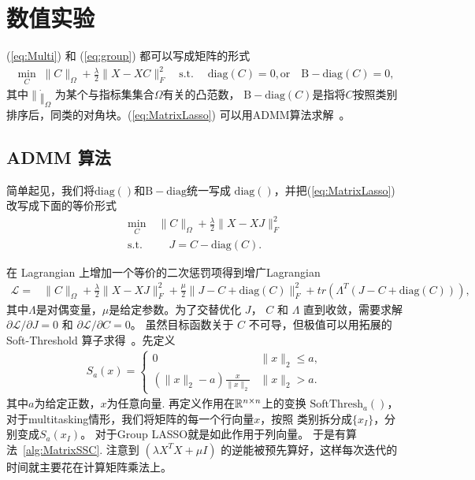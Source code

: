 \documentclass[main.tex]{subfiles}
\begin{document}
\chapter{数值实验}\label{chp:experiments}

(\ref{eq:Multi}) 和 (\ref{eq:group}) 都可以写成矩阵的形式
\begin{align}\label{eq:MatrixLasso}
  \min_{C} \; \|C\|_{\Omega}+\frac{\lambda}{2}\|X-XC\|_F^2 \quad
  \text{s.t.} \;\quad\mathrm{diag}(C)=0, \text{or} \quad \mathrm{B-diag}(C)=0,
\end{align}
其中$\|\dot\|_{\Omega}$ 为某个与指标集集合$\Omega$有关的凸范数，
$\mathrm{B-diag}(C)$是指将$C$按照类别排序后，同类的对角块。(\ref{eq:MatrixLasso})
可以用ADMM算法求解~\cite{boyd2011admm}。
\section{ADMM 算法}
简单起见，我们将$\mathrm{diag}()$和$\mathrm{B-diag}$统一写成
$\mathrm{diag}()$，并把(\ref{eq:MatrixLasso})改写成下面的等价形式
\begin{align}\label{eq:MatrixLasso_modify}
  \min_{C} \; &\|C\|_{\Omega}+\frac{\lambda}{2}\|X-XJ\|_F^2 \\
  \text{s.t.} \;&\quad J=C-\mathrm{diag}(C).
\end{align}

在 Lagrangian 上增加一个等价的二次惩罚项得到增广Lagrangian
\begin{align*}
  \mathcal{L}=& \|C\|_{\Omega}+\frac{\lambda}{2}\|X-XJ\|_F^2 
  + \frac{\mu}{2}\|J-C+\mathrm{diag}(C)\|_F^2
  +tr(\Lambda^T(J-C+\mathrm{diag}(C))),
\end{align*}
其中$\Lambda$是对偶变量，$\mu$是给定参数。为了交替优化
$J$， $C$ 和 $\Lambda$ 直到收敛，需要求解 $\partial \mathcal{L}/\partial J=0$
和 $\partial \mathcal{L}/\partial C=0$。
虽然目标函数关于 $C$ 不可导，但极值可以用拓展的 Soft-Threshold
算子求得~\cite{donoho1995noising}。先定义
\begin{align*}
  S_a(x) = \begin{cases}
    \mathrm{0} & \|x\|_2 \le a, \\
    (\|x\|_2 - a) \frac{x}{\|x\|_2} & \|x\|_2 > a.
  \end{cases}
\end{align*}
其中$a$为给定正数，$x$为任意向量.
再定义作用在$\mathbb{R}^{n\times n}$上的变换
$\mathrm{SoftThresh}_a()$，
对于multitasking情形，我们将矩阵的每一个行向量$x$，按照
类别拆分成$\{x_I\}$，分别变成$S_a(x_I)$。
对于Group LASSO就是如此作用于列向量。
于是有算法~\ref{alg:MatrixSSC}.
注意到 $(\lambda X^TX+\mu I)$
的逆能被预先算好，这样每次迭代的时间就主要花在计算矩阵乘法上。 
\end{document}
